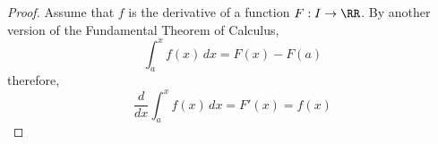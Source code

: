 

\begin{proof} Assume that $f$ is the derivative of a function 
$F:I\to\RR$. By another version of the Fundamental Theorem of Calculus, 
$$
\int_a^x f(x)\,dx = F(x)-F(a)
$$
therefore,
$$
\frac{d}{dx}\int_a^x f(x)\,dx = F'(x) = f(x)
$$
\end{proof}

